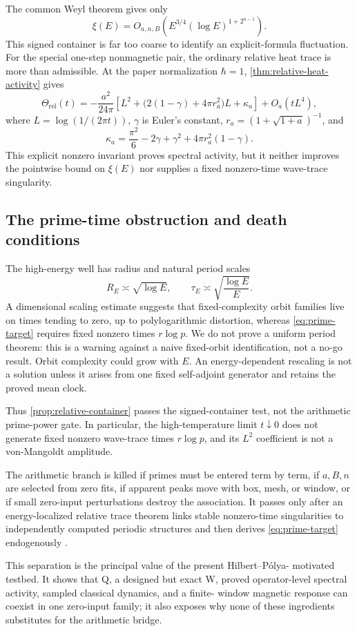 The common Weyl theorem gives only
\begin{equation}
 \xi(E)=O_{a,n,B}\!\left(
 E^{3/4}(\log E)^{1+2^{n-1}}\right).
 \label{eq:relative-staircase-bound}
\end{equation}
This signed container is far too coarse to identify an explicit-formula
fluctuation.  For the special one-step nonmagnetic pair, the ordinary
relative heat trace is more than admissible.  At the paper normalization
\(\hbar=1\), \cref{thm:relative-heat-activity} gives
\begin{equation}
 \Theta_{\mathrm{rel}}(t)
 =-\frac{a^2}{24\pi}
 \left[L^2+\bigl(2(1-\gamma)+4\pi r_a^2\bigr)L+\kappa_a\right]
 +O_a(tL^4),
 \label{eq:ledger-relative-heat}
\end{equation}
where \(L=\log(1/(2\pi t))\), \(\gamma\) is Euler's constant,
\(r_a=(1+\sqrt{1+a})^{-1}\), and
\[
 \kappa_a=\frac{\pi^2}{6}-2\gamma+\gamma^2+
 4\pi r_a^2(1-\gamma).
\]
This explicit nonzero invariant proves spectral activity, but it neither
improves the pointwise bound on \(\xi(E)\) nor supplies a fixed nonzero-time
wave-trace singularity.


\subsection{The prime-time obstruction and death conditions}
\label{sec:prime-time-obstruction}

The high-energy well has radius and natural period scales
\[
 R_E\asymp\sqrt{\log E},\qquad
 \tau_E\asymp\sqrt{\frac{\log E}{E}}.
\]
A dimensional scaling estimate suggests that fixed-complexity orbit families
live on times tending to zero, up to polylogarithmic distortion, whereas
\cref{eq:prime-target} requires fixed nonzero times \(r\log p\).  We do not
prove a uniform period theorem: this is a warning against a naive fixed-orbit
identification, not a no-go result.  Orbit complexity could grow with \(E\).
An energy-dependent rescaling is not a solution unless it arises from one
fixed self-adjoint generator and retains the proved mean clock.

Thus \cref{prop:relative-container} passes the signed-container test, not the
arithmetic prime-power gate.  In particular, the high-temperature limit
\(t\downarrow0\) does not generate fixed nonzero wave-trace times
\(r\log p\), and its \(L^2\) coefficient is not a von-Mangoldt amplitude.

The arithmetic branch is killed if primes must be entered term by term, if
\(a,B,n\) are selected from zero fits, if apparent peaks move with box, mesh,
or window, or if small zero-input perturbations destroy the association.
It passes only after an energy-localized relative trace theorem links stable
nonzero-time singularities to independently computed periodic structures and
then derives \cref{eq:prime-target} endogenously
\citep{DuistermaatGuillemin1975,CombescureRalstonRobert1999,Gutzwiller1971}.

This separation is the principal value of the present Hilbert--P\'olya-
motivated testbed.  It shows that Q, a designed but exact W, proved
operator-level spectral activity, sampled classical dynamics, and a finite-
window magnetic response can coexist in one zero-input family; it also
exposes why none of these ingredients substitutes for the arithmetic bridge.
